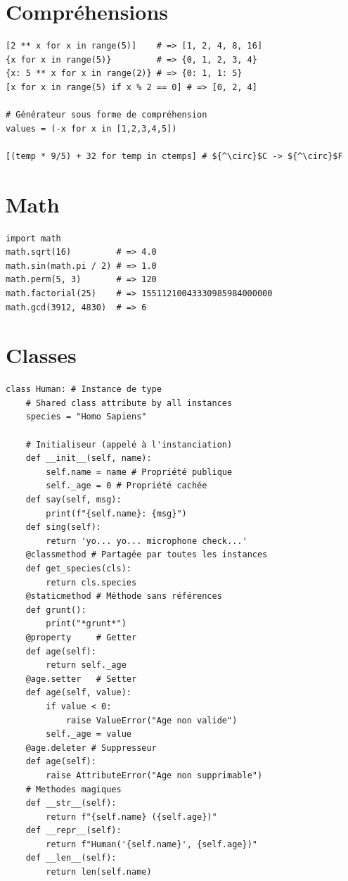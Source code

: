 \documentclass{article}
\begin{document}
\begin{multicols*}{4}
\section*{Compréhensions}
\begin{lstlisting}[mathescape]
[2 ** x for x in range(5)]    # => [1, 2, 4, 8, 16]
{x for x in range(5)}         # => {0, 1, 2, 3, 4}
{x: 5 ** x for x in range(2)} # => {0: 1, 1: 5}
[x for x in range(5) if x % 2 == 0] # => [0, 2, 4]

# Générateur sous forme de compréhension      
values = (-x for x in [1,2,3,4,5])

[(temp * 9/5) + 32 for temp in ctemps] # ${^\circ}$C -> ${^\circ}$F
\end{lstlisting}

\section*{Math}
\begin{lstlisting}
import math
math.sqrt(16)         # => 4.0
math.sin(math.pi / 2) # => 1.0
math.perm(5, 3)       # => 120
math.factorial(25)    # => 15511210043330985984000000 
math.gcd(3912, 4830)  # => 6
\end{lstlisting}

\section*{Classes}
\begin{lstlisting}
class Human: # Instance de type 
    # Shared class attribute by all instances
    species = "Homo Sapiens" 

    # Initialiseur (appelé à l'instanciation)
    def __init__(self, name):
        self.name = name # Propriété publique
        self._age = 0 # Propriété cachée
    def say(self, msg):
        print(f"{self.name}: {msg}")
    def sing(self):
        return 'yo... yo... microphone check...'  
    @classmethod # Partagée par toutes les instances
    def get_species(cls):
        return cls.species
    @staticmethod # Méthode sans références
    def grunt():
        print("*grunt*")
    @property     # Getter
    def age(self):
        return self._age
    @age.setter   # Setter 
    def age(self, value):
        if value < 0:
            raise ValueError("Age non valide")
        self._age = value
    @age.deleter # Suppresseur 
    def age(self):
        raise AttributeError("Age non supprimable")
    # Methodes magiques
    def __str__(self):
        return f"{self.name} ({self.age})"
    def __repr__(self):
        return f"Human('{self.name}', {self.age})"
    def __len__(self):
        return len(self.name)


\end{lstlisting}
\end{multicols*}
\end{document}
